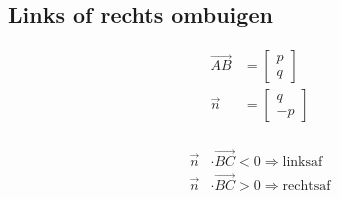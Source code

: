 \documentclass[a4paper, twocolumn]{article}
\renewcommand{\vec}{\overrightarrow}
\begin{document}
\subsection*{Links of rechts ombuigen}\vspace{-0.5em}
\begin{minipage}{0.45\linewidth}
\end{minipage}%
\begin{minipage}{0.25\linewidth}
	\begin{align*}
	\vec{AB} &= \begin{bmatrix} p \\ q \end{bmatrix} \\
	\vec{n} &= \begin{bmatrix} q \\ -p \end{bmatrix} \\
	\end{align*}
\end{minipage}%
\begin{minipage}{0.25\linewidth}
	\begin{align*}
	\vec{n} &\cdot \vec{BC} < 0 \Rightarrow \text{linksaf} \\
	\vec{n} &\cdot \vec{BC} > 0 \Rightarrow \text{rechtsaf}
	\end{align*}
\end{minipage}
\end{document}
